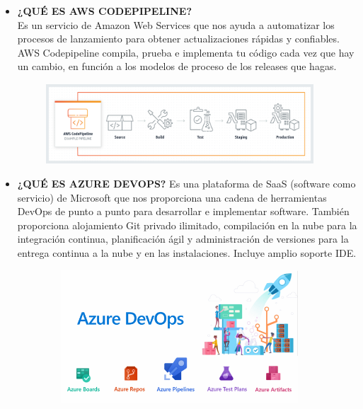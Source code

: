 \documentclass[12pt,a4paper,oneside]{book}
\begin{document}
\begin{enumerate}
\begin{itemize}
\begin{itemize}
						\end{itemize}
				
				
				
					
				\item \textbf{¿QUÉ ES AWS CODEPIPELINE?}\\
					Es un servicio de Amazon Web Services que nos ayuda a automatizar los procesos de lanzamiento para obtener actualizaciones rápidas y confiables. AWS Codepipeline compila, prueba e implementa tu código cada vez que hay un cambio, en función a los modelos de proceso de los releases que hagas.\\
					
			\newpage			
						\begin{center}
							\begin{figure}[htb]
								\centering \includegraphics[width=10cm, height=3cm]{img/code.png}
							\end{figure}
						\end{center}
						
					
				\item \textbf{¿QUÉ ES AZURE DEVOPS?}
					Es una plataforma de SaaS (software como servicio) de Microsoft que nos proporciona una cadena de herramientas DevOps de punto a punto para desarrollar e implementar software. También proporciona alojamiento Git privado ilimitado, compilación en la nube para la integración continua, planificación ágil y administración de versiones para la entrega continua a la nube y en las instalaciones. Incluye amplio soporte IDE.\\
					\begin{center}
						\begin{figure}[htb]
							\centering \includegraphics[width=10cm, height=5cm]{img/azure.png}
						\end{figure}
					\end{center}
						

\end{itemize}
\end{enumerate}
\end{document}
